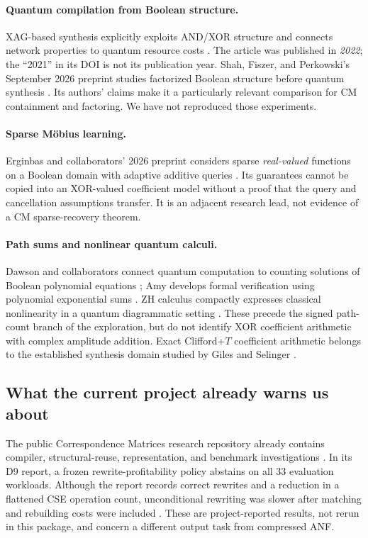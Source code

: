 \paragraph{Quantum compilation from Boolean structure.}
XAG-based synthesis explicitly exploits AND/XOR structure and connects network properties to quantum resource costs \cite{xag}. The article was published in \emph{2022}; the ``2021'' in its DOI is not its publication year. Shah, Fiszer, and Perkowski's September 2026 preprint studies factorized Boolean structure before quantum synthesis \cite{factorized}. Its authors' claims make it a particularly relevant comparison for CM containment and factoring. We have not reproduced those experiments.

\paragraph{Sparse M\"obius learning.}
Erginbas and collaborators' 2026 preprint considers sparse \emph{real-valued} functions on a Boolean domain with adaptive additive queries \cite{sparse2026}. Its guarantees cannot be copied into an XOR-valued coefficient model without a proof that the query and cancellation assumptions transfer. It is an adjacent research lead, not evidence of a CM sparse-recovery theorem.

\paragraph{Path sums and nonlinear quantum calculi.}
Dawson and collaborators connect quantum computation to counting solutions of Boolean polynomial equations \cite{dawson}; Amy develops formal verification using polynomial exponential sums \cite{amy}. ZH calculus compactly expresses classical nonlinearity in a quantum diagrammatic setting \cite{zh}. These precede the signed path-count branch of the exploration, but do not identify XOR coefficient arithmetic with complex amplitude addition. Exact Clifford+$T$ coefficient arithmetic belongs to the established synthesis domain studied by Giles and Selinger \cite{giles}.

\subsection{What the current project already warns us about}
The public Correspondence Matrices research repository already contains compiler, structural-reuse, representation, and benchmark investigations \cite{repo}. In its D9 report, a frozen rewrite-profitability policy abstains on all 33 evaluation workloads. Although the report records correct rewrites and a reduction in a flattened CSE operation count, unconditional rewriting was slower after matching and rebuilding costs were included \cite{d9}. These are project-reported results, not rerun in this package, and concern a different output task from compressed ANF.

